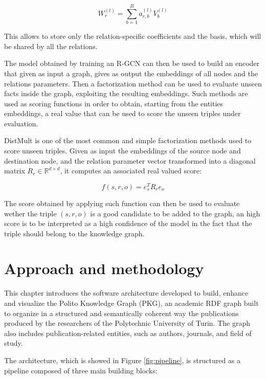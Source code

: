 \documentclass[%
    corpo=13.5pt,
    twoside,
    oldstyle,
    tipotesi=magistrale,
    greek,
    evenboxes
]{toptesi}
\begin{document}
\begin{equation}
    W_r^{(l)} = \sum_{b=1}^B a_{r,b}^{(l)} V_b^{(l)}
\end{equation}

This allows to store only the relation-specific coefficients and the basis,
which will be shared by all the relations.

The model obtained by training an R-GCN can then be used to build an encoder
that given as input a graph, gives as output the embeddings of all nodes and
the relations parameters. Then a factorization method can be used to
evaluate unseen facts inside the graph, exploiting the resulting embeddings.
Such methods are used as scoring functions in order to obtain, starting from
the entities embeddings, a real value that can be used to score the unseen
triples under evaluation.
\newline

DistMult \cite{yang2014} is one of the most common and simple factorization
methods used to score unseen triples. Given as input the embeddings of the
source node and destination node, and the relation parameter vector
transformed into a diagonal matrix $R_r\in\mathbb{R}^{d \times d}$, it computes
an associated real valued score:

\begin{equation}
    f(s,r,o) = e_s^T R_r e_o
\end{equation}

The score obtained by applying such function can then be used to evaluate
wether the triple $(s,r,o)$ is a good candidate to be added to the graph, an
high score is to be interpreted as a high confidence of the model
in the fact that the triple should belong to the knowledge graph.



\chapter{Approach and methodology}

This chapter introduces the software architecture developed to build, enhance
and visualize the Polito Knowledge Graph (PKG), an academic RDF graph
built to organize in a structured and semantically coherent way the publications
produced by the researchers of the Polytechnic University of Turin. The graph
also includes publication-related entities, such as authors, journals,
and field of study.

The architecture, which is showed in Figure \ref{fig:pipeline}, is structured
as a pipeline composed of three main building blocks:
\end{document}
